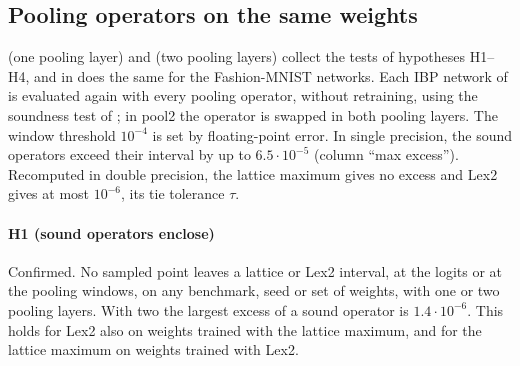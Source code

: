 \documentclass[preprint,12pt]{elsarticle}
\theoremstyle{definition}
\begin{document}
\subsection{Pooling operators on the same weights}

 (one pooling layer) and  (two pooling layers) collect the tests of hypotheses H1--H4, and  in  does the same for the Fashion-MNIST networks. Each IBP network of  is evaluated again with every pooling operator, without retraining, using the soundness test of ; in pool2 the operator is swapped in both pooling layers. The window threshold $10^{-4}$ is set by floating-point error. In single precision, the sound operators exceed their interval by up to $6.5\cdot10^{-5}$ (column ``max excess''). Recomputed in double precision, the lattice maximum gives no excess and Lex2 gives at most $10^{-6}$, its tie tolerance $\tau$.



\paragraph{H1 (sound operators enclose)} Confirmed. No sampled point leaves a lattice or Lex2 interval, at the logits or at the pooling windows, on any benchmark, seed or set of weights, with one or two pooling layers. With two the largest excess of a sound operator is $1.4\cdot10^{-6}$. This holds for Lex2 also on weights trained with the lattice maximum, and for the lattice maximum on weights trained with Lex2.
\end{document}
